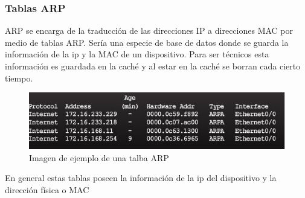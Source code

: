 \subsubsection{Tablas ARP}

\noindent ARP se encarga de la traducción de las direcciones IP a direcciones MAC por medio de tablas ARP. Sería una especie de base de datos donde se guarda la información de la ip y la MAC de un dispositivo. Para ser técnicos esta información es guardada en la caché y al estar en la caché se borran cada cierto tiempo. 

\begin{figure}[!h]
	\centering
	\includegraphics[scale=0.9]{images/arpexample.png}
	\caption{Imagen de ejemplo de una talba ARP}
	\label{arpexa}
\end{figure}

\noindent En general estas tablas poseen la información de la ip del dispositivo y la dirección física o MAC

